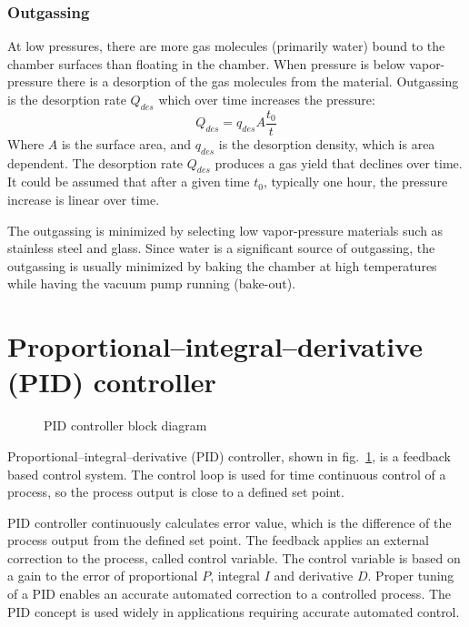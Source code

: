 \documentclass[\main/master.tex]{subfiles}
\begin{document}
\subsubsection{Outgassing}
\par\noindent
At low pressures, there are more gas molecules (primarily water) bound to the chamber surfaces than floating in the chamber. When pressure is below vapor-pressure there is a desorption of the gas molecules from the material. Outgassing is the desorption rate $Q_{des}$ which over time increases the pressure:
\begin{equation}
Q_{des} = q_{des} A\frac{t_0}{t}  \label{eqn:desorption rate}
\end{equation}
Where $A$ is the surface area, and $q_{des}$ is the desorption density, which is area dependent. The desorption rate $Q_{des}$ produces a gas yield that declines over time. It could be assumed that after a given time $t_0$, typically one hour, the pressure increase is linear over time.
\par\noindent
The outgassing is minimized by selecting low vapor-pressure materials such as stainless steel and glass. Since water is a significant source of outgassing, the outgassing is usually minimized by baking the chamber at high temperatures while having the vacuum pump running (bake-out).


\section{Proportional–integral–derivative (PID) controller}
\begin{figure}[htbp]
	\centering
	\caption[PID controller block diagram]{PID controller block diagram}
	\label{fig:PID_scheme}
\end{figure}
\FloatBarrier
\par\noindent
Proportional–integral–derivative (PID) controller, shown in fig.~\ref{fig:PID_scheme}, is a feedback based control system. The control loop is used for time continuous control of a process, so the process output is close to a defined set point.
\par\noindent
PID controller continuously calculates error value, which is the difference of the process output from the defined set point. The feedback applies an external correction to the process, called control variable. The control variable is based on a gain to the error of proportional $P$, integral $I$ and derivative $D$. Proper tuning of a PID enables an accurate automated correction to a controlled process. The PID concept is used widely in applications requiring accurate automated control.
\end{document}
